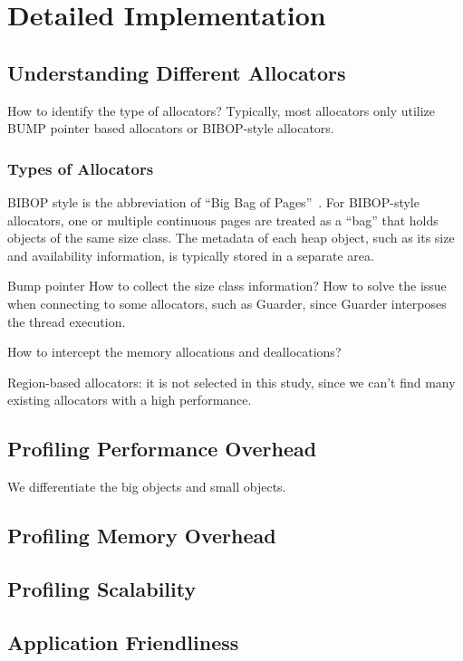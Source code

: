 \section{Detailed Implementation}





\subsection{Understanding Different Allocators}

How to identify the type of allocators? Typically, most allocators only utilize BUMP pointer based allocators or BIBOP-style allocators. 

\subsubsection{Types of Allocators}
BIBOP style is the abbreviation of ``Big Bag of Pages''~\cite{hanson1980}.
For BIBOP-style allocators, one or multiple continuous pages are treated as a ``bag'' that holds objects of the same size class. The metadata of each heap object, such as its size and availability information, is typically stored in a separate area.

Bump pointer
How to collect the size class information?
How to solve the issue when connecting to some allocators, such as Guarder, since Guarder interposes the thread execution. 

How to intercept the memory allocations and deallocations? 

Region-based allocators: 
it is not selected in this study, since we can't find many existing allocators with a high performance. 


\subsection{Profiling Performance Overhead}

We differentiate the big objects and small objects. 

\subsection{Profiling Memory Overhead}

\subsection{Profiling Scalability}

\subsection{Application Friendliness}
